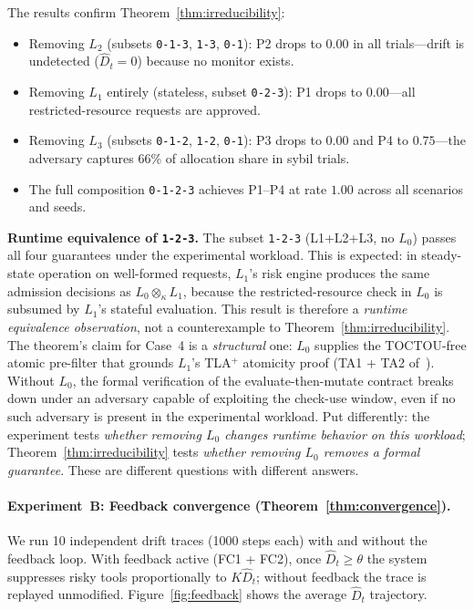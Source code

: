 \documentclass[11pt]{article}
\newcommand{\Layer}[1]{L_{#1}}
\newcommand{\Comp}{\otimes_\kappa}
\begin{document}
The results confirm Theorem~\ref{thm:irreducibility}:
\begin{itemize}[noitemsep]
  \item Removing $\Layer{2}$ (subsets \texttt{0-1-3}, \texttt{1-3},
    \texttt{0-1}): P2 drops to $0.00$ in all trials---drift is undetected
    ($\hat{D}_t = 0$) because no monitor exists.
  \item Removing $\Layer{1}$ entirely (stateless, subset \texttt{0-2-3}):
    P1 drops to $0.00$---all restricted-resource requests are approved.
  \item Removing $\Layer{3}$ (subsets \texttt{0-1-2}, \texttt{1-2},
    \texttt{0-1}): P3 drops to $0.00$ and P4 to $0.75$---the adversary
    captures 66\% of allocation share in sybil trials.
  \item The full composition \texttt{0-1-2-3} achieves P1--P4 at rate
    $1.00$ across all scenarios and seeds.
\end{itemize}

\noindent\textbf{Runtime equivalence of \texttt{1-2-3}.}\enspace
The subset \texttt{1-2-3} (L1+L2+L3, no $\Layer{0}$) passes all four
guarantees under the experimental workload.  This is expected: in
steady-state operation on well-formed requests, $\Layer{1}$'s risk engine
produces the same admission decisions as $\Layer{0} \Comp \Layer{1}$,
because the restricted-resource check in $\Layer{0}$ is subsumed by
$\Layer{1}$'s stateful evaluation.  This result is therefore a
\emph{runtime equivalence observation}, not a counterexample to
Theorem~\ref{thm:irreducibility}.  The theorem's claim for Case~4 is a
\emph{structural} one: $\Layer{0}$ supplies the TOCTOU-free atomic
pre-filter that grounds $\Layer{1}$'s TLA$^+$ atomicity proof
(TA1 + TA2 of~\cite{fernandez2026a}).  Without $\Layer{0}$, the formal
verification of the evaluate-then-mutate contract breaks down under an
adversary capable of exploiting the check-use window, even if no such
adversary is present in the experimental workload.  Put differently: the
experiment tests \emph{whether removing $\Layer{0}$ changes runtime
behavior on this workload}; Theorem~\ref{thm:irreducibility} tests
\emph{whether removing $\Layer{0}$ removes a formal guarantee}.
These are different questions with different answers.

\paragraph{Experiment~B: Feedback convergence (Theorem~\ref{thm:convergence}).}
We run 10 independent drift traces (1000 steps each) with and without the
feedback loop.  With feedback active (FC1 + FC2), once $\hat{D}_t \ge \theta$
the system suppresses risky tools proportionally to $K\hat{D}_t$; without
feedback the trace is replayed unmodified.
Figure~\ref{fig:feedback} shows the average $\hat{D}_t$ trajectory.
\end{document}
